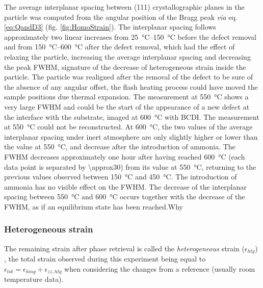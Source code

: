 The average interplanar spacing between (111) crystallographic planes in the particle was computed from the angular position of the Bragg peak \textit{via} eq. \ref{eq:QandD3} (fig. \ref{fig:HomoStrain}).
The interplanar spacing follows approximately two linear increases from \qtyrange{25}{150}{\degreeCelsius} before the defect removal and from \qtyrange{150}{600}{\degreeCelsius} after the defect removal, which had the effect of relaxing the particle, increasing the average interplanar spacing and decreasing the peak FWHM, signature of the decrease of heterogeneous strain inside the particle.
The particle was realigned after the removal of the defect to be sure of the absence of any angular offset, the flash heating process could have moved the sample positions due thermal expansion.
The measurement at \qty{550}{\degreeCelsius} shows a very large FWHM and could be the start of the appearance of a new defect at the interface with the substrate, imaged at \qty{600}{\degreeCelsius} with BCDI.
The measurement at \qty{550}{\degreeCelsius} could not be reconstructed.
At \qty{600}{\degreeCelsius}, the two values of the average interplanar spacing under inert atmosphere are only slightly higher or lower than the value at \qty{550}{\degreeCelsius}, and decrease after the introduction of ammonia.
The FWHM decreases approximately one hour after having reached \qty{600}{\degreeCelsius} (each data point is separated by \qty{\approx30}{\min}) from its value at \qty{550}{\degreeCelsius}, returning to the previous values observed between \qty{150}{\degreeCelsius} and \qty{450}{\degreeCelsius}.
The introduction of ammonia has no visible effect on the FWHM.
The decrease of the interplanar spacing between \qty{550}{\degreeCelsius} and \qty{600}{\degreeCelsius} occurs together with the decrease of the FWHM, as if an equilibrium state has been reached.\textcolor{Important}{Why}

\subsubsection{Heterogeneous strain}

The remaining strain after phase retrieval is called the \textit{heterogeneous} strain ($\epsilon_{htg}$) \parencite{GREDIAC1996, FAVIER2007, Atlan2023}, the total strain observed during this experiment being equal to $\epsilon_{tot} = \epsilon_{hmg} + \epsilon_{zz, htg}$ when considering the changes from a reference (usually room temperature data).


